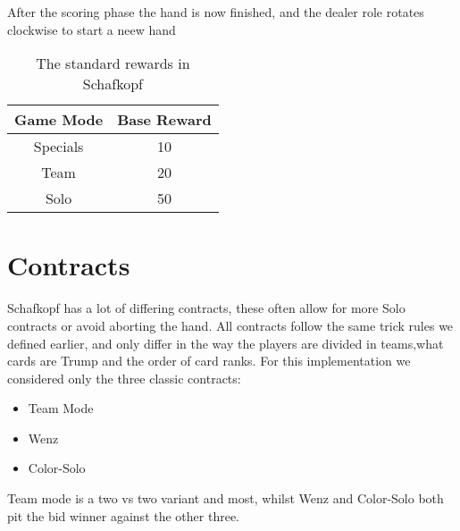 After the scoring phase the hand is now finished, and the dealer role rotates clockwise to start a neew hand
\begin{table}[h!]
    \centering
    \begin{tabular}{cc}
        \toprule
        Game Mode & Base Reward \\
        \midrule
        Specials  & 10          \\
        Team      & 20          \\
        Solo      & 50          \\
        \bottomrule
\end{tabular}
    \caption{The standard rewards in Schafkopf}
    \label{tab:rewardsStrucutre}
\end{table}


\section{Contracts}
Schafkopf has a lot of differing contracts, these often allow for more Solo contracts or avoid aborting the hand.
All contracts follow the same trick rules we defined earlier, and only differ in the way the players are divided in
teams,what cards are Trump and the order of card ranks.
For this implementation we considered only the three classic contracts:
\begin{itemize}
    \item Team Mode
    \item Wenz
    \item Color-Solo
\end{itemize}
Team mode is a two vs two variant and most, whilst Wenz and Color-Solo both pit the bid winner against the other three.

